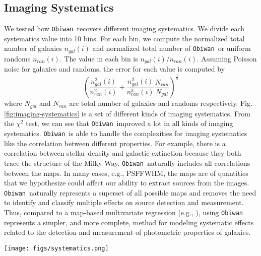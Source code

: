 \documentclass[a4paper,fleqn,usenatbib]{mnras}
\newcommand{\obiwan}{{\tt Obiwan}}
\begin{document}
\subsection{Imaging Systematics}

We tested how \obiwan \, recovers different imaging systematics. We divide each systematics value into 10 bins. For each bin, we compute the normalized total number of galaxies $n_{gal}(i)$ and normalized total number of \obiwan \, or uniform randoms $n_{ran}(i)$. The value in each bin is $n_{gal}(i)$/$n_{ran}(i)$. Assuming Poisson noise for galaxies and randoms, the error for each value is computed by
\begin{equation}
(\frac{n^2_{gal}(i)}{n^2_{ran}(i)}+\frac{n^2_{gal}(i)}{n^3_{ran}(i)}\frac{N_{ran}}{N_{gal}})^\frac{1}{2}
\end{equation}
where $N_{gal}$ and $N_{ran}$ are total number of galaxies and randoms respectively. Fig. \ref{fig:imaging-systematics} is a set of different kinds of imaging systematics. From the $\chi^2$ test, we can see that \obiwan \, improved a lot in all kinds of imaging systematics. \obiwan \, is able to handle the complexities for imaging systematics like the correlation between different properties. For example, there is a correlation between stellar density and galactic extinction because they both trace the structure of the Milky Way. \obiwan\, naturally includes all correlations between the maps. In many cases, e.g., PSFFWHM, the maps are of quantities that we hypothesize could affect our ability to extract sources from the images. \obiwan\, naturally represents a superset of all possible maps and removes the need to identify and classify multiple effects on source detection and measurement. Thus, compared to a map-based multivariate regression (e.g., \cite{anand17}), using \obiwan\, represents a simpler, and more complete, method for modeling systematic effects related to the detection and measurement of photometric properties of galaxies.

\begin{figure*}
\begin{center}
\texttt{[image: figs/systematics.png]}
\caption{Number density fluctuations in \obiwan \, and uniform randoms as a function of different imaging systematics. Red compares galaxy data with \obiwan \,randoms. Blue compares galaxy data with uniform randoms. Each data point is the normalized number density of galaxies divided by normalized number density of \obiwan \, or uniform randoms. The $\chi^2$ test shows how the total distribution deviates from the black dotted reference line.}
\label{fig:imaging-systematics}
\end{center}
\end{figure*}
\end{document}
